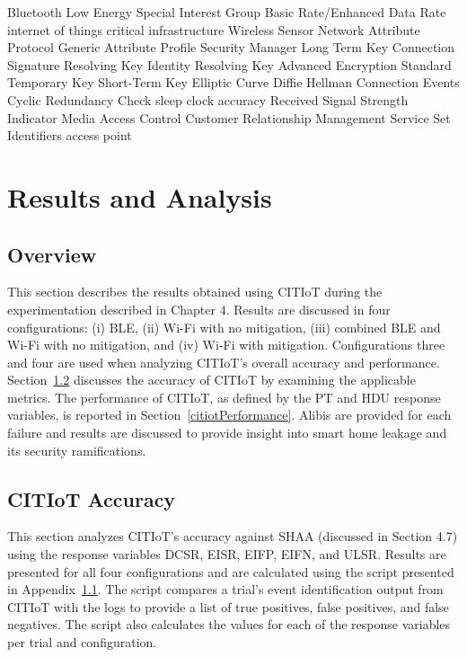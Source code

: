 \documentclass[12pt,letterpaper,oneside]{book}
\begin{document}
	\begin{acronym}
		 {Bluetooth Low Energy}
		 {Special Interest Group}
		 {Basic Rate/Enhanced Data Rate}
		 {internet of things}
		 {critical infrastructure}
		 {Wireless Sensor Network}
		 {Attribute Protocol}
		 {Generic Attribute Profile}
		 {Security Manager}
		 {Long Term Key}
		 {Connection Signature Resolving Key}
		 {Identity Resolving Key}
		 {Advanced Encryption Standard}
		 {Temporary Key}
		 {Short-Term Key}
		 {Elliptic Curve Diffie Hellman}
		 {Connection Events}
		 {Cyclic Redundancy Check}
		 {sleep clock accuracy}
		 {Received Signal Strength Indicator}
		 {Media Access Control}
		 {Customer Relationship Management}
		 {Service Set Identifiers}
		 {access point}
	\end{acronym}
	\mainmatter
	\chapter{Results and Analysis}
	
	\section{Overview}
	This section describes the results obtained using \ac{CITIoT} during the experimentation described in Chapter 4. Results are discussed in four configurations: (i) \ac{BLE}, (ii) Wi-Fi with no mitigation, (iii) combined \ac{BLE} and Wi-Fi with no mitigation, and (iv) Wi-Fi with mitigation. Configurations three and four are used when analyzing \ac{CITIoT}'s overall accuracy and performance. Section~\ref{citiotAccuracy} discusses the accuracy of \ac{CITIoT} by examining the applicable metrics. The performance of \ac{CITIoT}, as defined by the \ac{PT} and \ac{HDU} response variables, is reported in Section~\ref{citiotPerformance}. Alibis are provided for each failure and results are discussed to provide insight into smart home leakage and its security ramifications.
	
	\section{CITIoT Accuracy} \label{citiotAccuracy}
	This section analyzes \ac{CITIoT}'s accuracy against \ac{SHAA} (discussed in Section 4.7) using the response variables \ac{DCSR}, \ac{EISR}, \ac{EIFP}, \ac{EIFN}, and \ac{ULSR}. Results are presented for all four configurations and are calculated using the script presented in Appendix~\ref{}. The script compares a trial's event identification output from \ac{CITIoT} with the logs to provide a list of true positives, false positives, and false negatives. The script also calculates the values for each of the response variables per trial and configuration.
	
\end{document}

